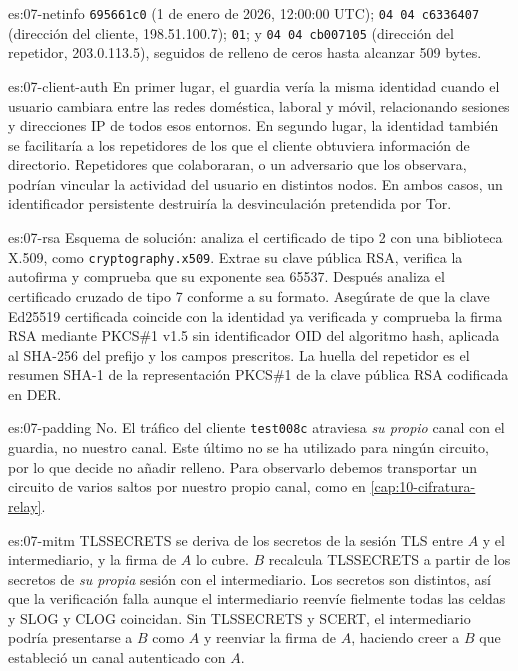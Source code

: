 \begin{soluzione}{es:07-netinfo}
\texttt{695661c0} (1 de enero de 2026, 12:00:00 UTC); \texttt{04 04 c6336407} (dirección del cliente, 198.51.100.7); \texttt{01}; y \texttt{04 04 cb007105} (dirección del repetidor, 203.0.113.5), seguidos de relleno de ceros hasta alcanzar 509 bytes.
\end{soluzione}

\begin{soluzione}{es:07-client-auth}
En primer lugar, el guardia vería la misma identidad cuando el usuario cambiara entre las redes doméstica, laboral y móvil, relacionando sesiones y direcciones IP de todos esos entornos. En segundo lugar, la identidad también se facilitaría a los repetidores de los que el cliente obtuviera información de directorio. Repetidores que colaboraran, o un adversario que los observara, podrían vincular la actividad del usuario en distintos nodos. En ambos casos, un identificador persistente destruiría la desvinculación pretendida por Tor.
\end{soluzione}

\begin{soluzione}{es:07-rsa}
Esquema de solución: analiza el certificado de tipo 2 con una biblioteca X.509, como \texttt{cryptography.x509}. Extrae su clave pública RSA, verifica la autofirma y comprueba que su exponente sea 65537. Después analiza el certificado cruzado de tipo 7 conforme a su formato. Asegúrate de que la clave Ed25519 certificada coincide con la identidad ya verificada y comprueba la firma RSA mediante PKCS\#1 v1.5 sin identificador OID del algoritmo hash, aplicada al SHA-256 del prefijo y los campos prescritos. La huella del repetidor es el resumen SHA-1 de la representación PKCS\#1 de la clave pública RSA codificada en DER.
\end{soluzione}

\begin{soluzione}{es:07-padding}
No. El tráfico del cliente \texttt{test008c} atraviesa \emph{su propio} canal con el guardia, no nuestro canal. Este último no se ha utilizado para ningún circuito, por lo que  decide no añadir relleno. Para observarlo debemos transportar un circuito de varios saltos por nuestro propio canal, como en \cref{cap:10-cifratura-relay}.
\end{soluzione}

\begin{soluzione}{es:07-mitm}
TLSSECRETS se deriva de los secretos de la sesión TLS entre $A$ y el intermediario, y la firma de $A$ lo cubre. $B$ recalcula TLSSECRETS a partir de los secretos de \emph{su propia} sesión con el intermediario. Los secretos son distintos, así que la verificación falla aunque el intermediario reenvíe fielmente todas las celdas y SLOG y CLOG coincidan. Sin TLSSECRETS y SCERT, el intermediario podría presentarse a $B$ como $A$ y reenviar la firma de $A$, haciendo creer a $B$ que estableció un canal autenticado con $A$.
\end{soluzione}

